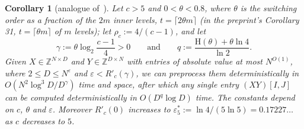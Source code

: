 \documentclass[11pt]{article}
\newtheorem{corollary}[theorem]{Corollary}
\theoremstyle{definition}
\theoremstyle{remark}
\newcommand{\Z}{\mathbb{Z}}
\newcommand{\Hh}{\mathrm{H}}
\newcommand{\es}{\varepsilon^*_5}
\begin{document}
\begin{corollary}[analogue of~{\cite[Corollary 31]{ZT}}]\label{m:cor:tradeoff}
Let $c>5$ and $0<\theta<0.8$, where $\theta$ is the switching order as a fraction of the $2m$ inner levels, $t=\lceil2\theta m\rceil$ (in the preprint's Corollary 31, $t=\lceil\theta m\rceil$ of $m$ levels); let $\rho_c:=4/(c-1)$, and let
\[
\gamma:=\theta\log_2\frac{c-1}4>0\qquad\text{and}\qquad q:=\frac{\Hh(\theta)+\theta\ln4}{\ln2}.
\]
Given $X\in\Z^{N\times D}$ and $Y\in\Z^{D\times N}$ with entries of absolute value at most $N^{O(1)}$, where $2\le D\le N^\varepsilon$ and $\varepsilon<R'_c(\gamma)$, we can preprocess them deterministically in $O(N^2\log^3\!D/D^\gamma)$ time and space, after which any single entry $(XY)[I,J]$ can be computed deterministically in $O(D^q\log D)$ time. The constants depend on $c$, $\theta$ and $\varepsilon$. Moreover $R'_c(0)$ increases to $\es:=\ln4/(5\ln5)=0.17227\ldots$ as $c$ decreases to $5$.
\end{corollary}
\end{document}
